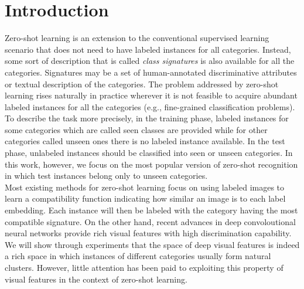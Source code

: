 \documentclass[10pt,twocolumn,letterpaper]{article}
\begin{document}
\section{Introduction}
Zero-shot learning is an extension to the conventional supervised learning scenario
that does not need to have labeled instances for all categories.
Instead, some sort of description that is called \textit{class signatures} is also available for all the categories.
Signatures may be a set of human-annotated discriminative attributes or textual description of the categories.
The problem addressed by zero-shot learning rises naturally in practice wherever it is not feasible to acquire abundant labeled instances for all the categories (e.g., fine-grained classification problems).
To describe the task more precisely, in the training phase, labeled instances for some categories which are called seen classes are provided
while for other categories called unseen ones there is no labeled instance available.
In the test phase, unlabeled instances should be classified into seen or unseen categories. In this work, however, we focus on the most popular version of zero-shot recognition in which test instances belong only to unseen categories.
\\ %
Most existing methods for zero-shot learning focus on using labeled images to learn a compatibility function indicating how similar an image is
to each label embedding. Each instance will then be labeled with the category having the most compatible signature.
 On the other hand, recent advances in deep convoloutional neural networks provide rich visual features with high discrimination capability.
  We will show through experiments that the space of deep visual features is indeed a rich space in which instances of different categories usually form natural clusters. However, little attention has been paid to exploiting this property of visual features in the context of zero-shot learning.

\end{document}
